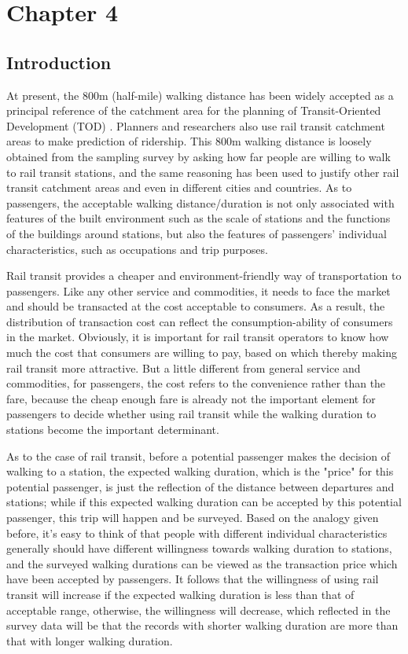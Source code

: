 \chapter{Chapter 4}
%
\section{Introduction}
At present, the 800m (half-mile) walking distance has been widely accepted as a principal reference of the catchment area for the planning of Transit-Oriented Development (TOD) \cite{kuby2004factors,gutierrez2011transit,cardozo2012application,zhao2013influences}. Planners and researchers also use rail transit catchment areas to make prediction of ridership. This 800m walking distance is loosely obtained from the sampling survey by asking how far people are willing to walk to rail transit stations, and the same reasoning has been used to justify other rail transit catchment areas and even in different cities and countries. As to passengers, the acceptable walking distance/duration is not only associated with features of the built environment such as the scale of stations and the functions of the buildings around stations, but also the features of passengers' individual characteristics, such as occupations and trip purposes.

%
Rail transit provides a cheaper and environment-friendly way of transportation to passengers. Like any other service and commodities, it needs to face the market and should be transacted at the cost acceptable to consumers. As a result, the distribution of transaction cost can reflect the consumption-ability of consumers in the market. Obviously, it is important for rail transit operators to know how much the cost that consumers are willing to pay, based on which thereby making rail transit more attractive. But a little different from general service and commodities, for passengers, the cost refers to the convenience rather than the fare, because the cheap enough fare is already not the important element for passengers to decide whether using rail transit while the walking duration to stations become the important determinant.

%
As to the case of rail transit, before a potential passenger makes the decision of walking to a station, the expected walking duration, which is the "price" for this potential passenger, is just the reflection of the distance between departures and stations; while if this expected walking duration can be accepted by this potential passenger, this trip will happen and be surveyed. Based on the analogy given before, it's easy to think of that people with different individual characteristics generally should have different willingness towards walking duration to stations, and the surveyed walking durations can be viewed as the transaction price which have been accepted by passengers. It follows that the willingness of using rail transit will increase if the expected walking duration is less than that of acceptable range, otherwise, the willingness will decrease, which reflected in the survey data will be that the records with shorter walking duration are more than that with longer walking duration. 

